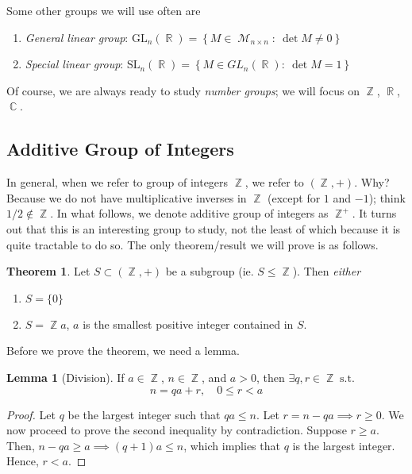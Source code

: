 \documentclass[11pt]{amsart} %
\theoremstyle{definition}
\newtheorem{theorem}[definition]{Theorem}
\newtheorem{lemma}[definition]{Lemma}
\theoremstyle{definition}
\DeclareMathOperator{\R}{\mathbb{R}}
\DeclareMathOperator{\Z}{\mathbb{Z}}
\DeclareMathOperator{\Com}{\mathbb{C}}
\DeclareMathOperator{\suchthat}{\text{ s.t. }}
\DeclareMathOperator{\Ma}{\mathcal{M}}
\numberwithin{equation}{section}
\newcommand{\condset}[4]{\left\{ #1  : \: #2 #3 #4 \right\}}
\newcommand{\SL}[2]{\mathrm{SL}_{#1}(#2)}
\newcommand{\GL}[2]{\mathrm{GL}_{#1}(#2)}
\begin{document}
Some other groups we will use often are
\begin{enumerate}[noitemsep]
	\item \textit{General linear group}: $\GL{n}{\R} = \condset{ M \in \Ma_{n \times n}}{\det M}{\neq}{0}$
	\item \textit{Special linear group}: $\SL{n}{\R} = \condset{ M \in GL_n (\R)}{ \det M }{=}{ 1} $
\end{enumerate}

Of course, we are always ready to study \textit{number groups}; we will focus on $\Z$, $\R$, $\Com$.

\subsection{Additive Group of Integers}

In general, when we refer to group of integers $\Z$, we refer to $(\Z, +)$. Why? Because we do not have multiplicative inverses in $\Z$ (except for $1$ and $-1$); think $1/2 \notin \Z$. In what follows, we denote additive group of integers as $\Z^+$. It turns out that this is an interesting group to study, not the least of which because it is quite tractable to do so. The only theorem/result we will prove is as follows.

\begin{theorem}
	Let $S \subset (\Z,+)$ be a subgroup (ie. $S \leq \Z$). Then \textit{either}
	\begin{enumerate}[noitemsep]
		\item $S = \{0\}$
		\item $S = \Z a$, $a$ is the smallest positive integer contained in $S$.
	\end{enumerate}
\end{theorem}

Before we prove the theorem, we need a lemma.

\begin{lemma}[Division]
	If $a\in \Z$, $n \in \Z$, and $a>0$, then $\exists q,r \in \Z \suchthat$
	$$ n = qa + r, \quad 0 \leq r < a $$
\end{lemma}

\begin{proof}
	Let $q$ be the largest integer such that $qa \leq n$. Let $r = n -qa \implies r \geq 0$. We now proceed to prove the second inequality by contradiction. Suppose $r \geq a$. Then, $ n - qa \geq a \implies (q+1)a \leq n $, which implies that $q$ is the largest integer. Hence, $r < a$.
\end{proof}
\end{document}
